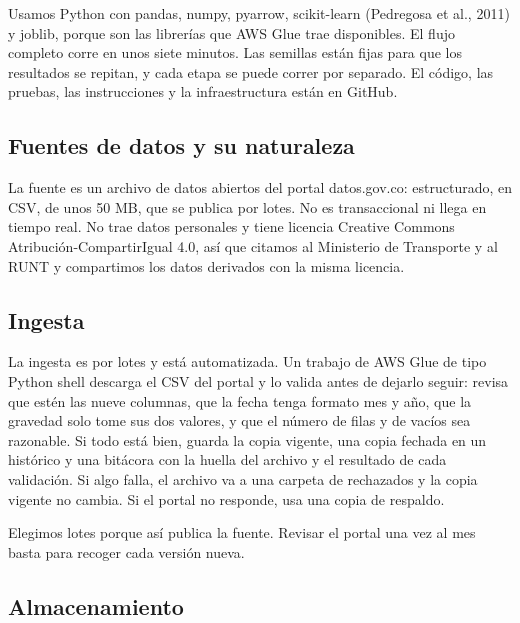 \documentclass[11pt,a4paper]{article}
\begin{document}
Usamos Python con pandas, numpy, pyarrow, scikit-learn (Pedregosa et al., 2011) y joblib, porque son las librerías que AWS Glue trae disponibles. El flujo completo corre en unos siete minutos. Las semillas están fijas para que los resultados se repitan, y cada etapa se puede correr por separado. El código, las pruebas, las instrucciones y la infraestructura están en GitHub.

\subsection{Fuentes de datos y su naturaleza}

La fuente es un archivo de datos abiertos del portal datos.gov.co: estructurado, en CSV, de unos 50 MB, que se publica por lotes. No es transaccional ni llega en tiempo real. No trae datos personales y tiene licencia Creative Commons Atribución-CompartirIgual 4.0, así que citamos al Ministerio de Transporte y al RUNT y compartimos los datos derivados con la misma licencia.


\subsection{Ingesta}

La ingesta es por lotes y está automatizada. Un trabajo de AWS Glue de tipo Python shell descarga el CSV del portal y lo valida antes de dejarlo seguir: revisa que estén las nueve columnas, que la fecha tenga formato mes y año, que la gravedad solo tome sus dos valores, y que el número de filas y de vacíos sea razonable. Si todo está bien, guarda la copia vigente, una copia fechada en un histórico y una bitácora con la huella del archivo y el resultado de cada validación. Si algo falla, el archivo va a una carpeta de rechazados y la copia vigente no cambia. Si el portal no responde, usa una copia de respaldo.

Elegimos lotes porque así publica la fuente. Revisar el portal una vez al mes basta para recoger cada versión nueva.

\subsection{Almacenamiento}
\end{document}
